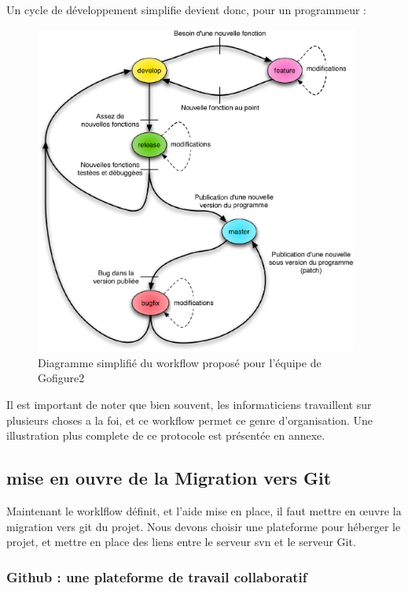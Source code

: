 Un cycle de développement simplifie devient donc, pour un programmeur :
\begin{figure}[H]
\begin{center}
\leavevmode
\includegraphics[width=0.95\textwidth]{pictures/GIT_WorkflowSimple}
\end{center}
\caption{Diagramme simplifié du workflow proposé pour l'équipe de Gofigure2}
\label{fig:Workflow GIT de Gofigure2}
\end{figure}

Il est important de noter que bien souvent, les informaticiens travaillent sur plusieurs choses a la foi, et ce workflow permet ce genre d'organisation. 
Une illustration plus complete de ce protocole est présentée en annexe.


\subsection{mise en ouvre de la Migration vers Git}

Maintenant le worklflow définit, et l'aide mise en place, il faut mettre en œuvre la migration vers git du projet. Nous devons choisir une plateforme pour héberger le projet, et mettre en place des liens entre le serveur svn et le serveur Git.

\subsubsection{Github : une plateforme de travail collaboratif}

